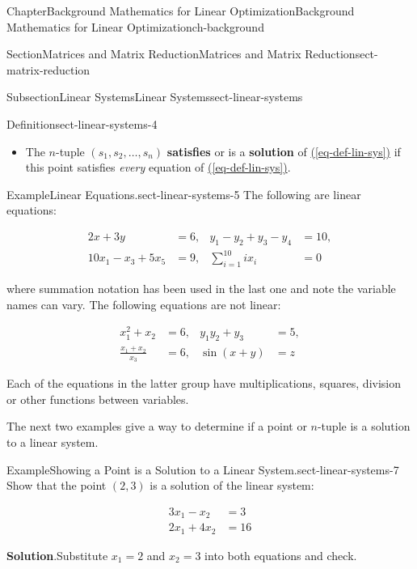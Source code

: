 \documentclass[oneside,10pt,]{book}
\newcommand{\blocktitlefont}{\relax}
\newcommand{\xreffont}{\relax}
\newcommand{\terminology}[1]{\textbf{#1}}
\numberwithin{equation}{section}
\newcommand{\amp}{&}
\begin{document}
\begin{chapterptx}{Chapter}{Background Mathematics for Linear Optimization}{}{Background Mathematics for Linear Optimization}{}{}{ch-background}
\begin{sectionptx}{Section}{Matrices and Matrix Reduction}{}{Matrices and Matrix Reduction}{}{}{sect-matrix-reduction}
\begin{subsectionptx}{Subsection}{Linear Systems}{}{Linear Systems}{}{}{sect-linear-systems}
\begin{definition}{Definition}{}{sect-linear-systems-4}
\begin{itemize}[label=\textbullet]
%
\par
and this linear system has \(m\) equations and \(n\) unknowns (variables). The equations in \hyperref[eq-traffic]{({\xreffont\ref{eq-traffic}})} is an example of a linear system.%
\item{}The \(n\)-tuple \((s_1,s_2,\ldots,s_n)\) \terminology{satisfies} or is a \terminology{solution} of \hyperref[eq-def-lin-sys]{({\xreffont\ref{eq-def-lin-sys}})} if this point satisfies \emph{every} equation of \hyperref[eq-def-lin-sys]{({\xreffont\ref{eq-def-lin-sys}})}.%
\end{itemize}
%
\end{definition}
\begin{example}{Example}{Linear Equations.}{sect-linear-systems-5}%
The following are linear equations:%
\par
%
\begin{align*}
2x + 3y \amp = 6, \amp y_1 -y_2+y_3-y_4 \amp = 10, \\
10x_1 - x_3 + 5x_5 \amp = 9, \amp \sum_{i=1}^{10} i x_i \amp = 0
\end{align*}
%
\par
where summation notation has been used in the last one and note the variable names can vary. The following equations are not linear:%
\par
%
\begin{align*}
x_1^2+x_2 \amp = 6, \amp y_1y_2 + y_3 \amp = 5, \\
\frac{x_1+x_2}{x_3} \amp = 6, \amp \sin(x+y) \amp = z
\end{align*}
%
\par
Each of the equations in the latter group have multiplications, squares, division or other functions between variables.%
\end{example}
The next two examples give a way to determine if a point or \(n\)-tuple is a solution to a linear system.%
\begin{example}{Example}{Showing a Point is a Solution to a Linear System.}{sect-linear-systems-7}%
Show that the point \((2,3)\) is a solution of the linear system:%
\par
%
\begin{align*}
3x_1 - x_2 \amp = 3 \\
2x_1 + 4x_2 \amp = 16
\end{align*}
%
\par\smallskip%
\noindent\textbf{\blocktitlefont Solution}.\hypertarget{sect-linear-systems-7-3}{}\quad{}Substitute \(x_1=2\) and \(x_2=3\) into both equations and check.%
\par

\end{example}
\end{subsectionptx}
\end{sectionptx}
\end{chapterptx}
\end{document}
